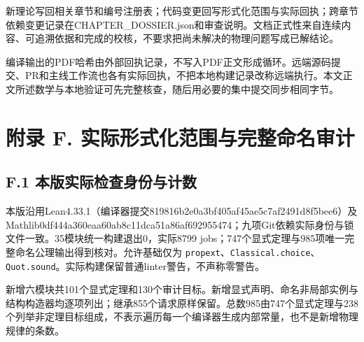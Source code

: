 \documentclass[
  11pt,
  oneside]{book}
\begin{document}
新理论写回相关章节和编号注册表；代码变更回写形式化范围与实际回执；跨章节依赖变更记录在CHAPTER\_\allowbreak DOSSIER.json和审查说明。文档正式性来自连续内容、可追溯依据和完成的校核，不要求把尚未解决的物理问题写成已解结论。

编译输出的PDF哈希由外部回执记录，不写入PDF正文形成循环。远端源码提交、PR和主线工作流也各有实际回执，不把本地构建记录改称远端执行。本文正文所述数学与本地验证可先完整核查，随后用必要的集中提交同步相同字节。

\hypertarget{appendix-f}{%
\chapter{附录 F. 实际形式化范围与完整命名审计}\label{appendix-f}}

\hypertarget{f.1-ux672cux7248ux5b9eux9645ux68c0ux67e5ux8eabux4efdux4e0eux8ba1ux6570}{%
\section{F.1
本版实际检查身份与计数}\label{f.1-ux672cux7248ux5b9eux9645ux68c0ux67e5ux8eabux4efdux4e0eux8ba1ux6570}}

本版沿用Lean4.33.1（编译器提交819816b2e0a3bf405af45ae5c7af2491d8f5bee6）及Mathlib0df444a360eaa60ab8c11dca51a86af692955474；九项Git依赖实际身份与锁文件一致。35模块统一构建退出0，实际8799
jobs；747个显式定理与985项唯一完整命名公理输出得到核对。允许基础仅为
\texttt{propext}、\allowbreak \texttt{Classical.choice}、\allowbreak \texttt{Quot.sound}。实际构建保留普通linter警告，不声称零警告。

新增六模块共101个显式定理和130个审计目标。新增显式声明、命名非局部实例与结构构造器均逐项列出；继承855个请求原样保留。总数985由747个显式定理与238个列举非定理目标组成，不表示遍历每一个编译器生成内部常量，也不是新增物理规律的条数。
\end{document}
